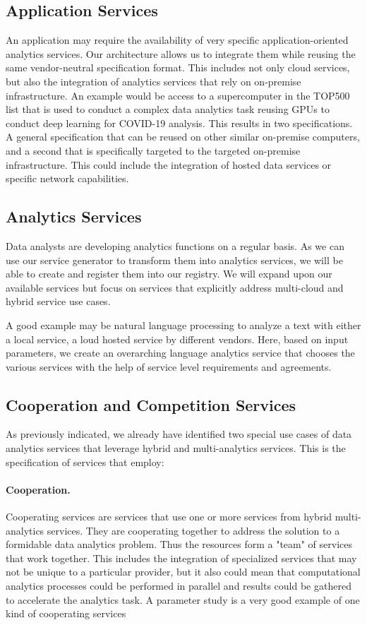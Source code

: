 \subsection{Application Services}

An application may require the availability of very specific
application-oriented analytics services. Our architecture allows us to
integrate them while reusing the same vendor-neutral specification
format. This includes not only cloud services, but also the
integration of analytics services that rely on on-premise
infrastructure. An example would be access to a supercomputer in the
TOP500 list that is used to conduct a complex data analytics task
reusing GPUs to conduct deep learning for COVID-19 analysis.  This
results in two specifications. A general specification that can be
reused on other similar on-premise computers, and a second that is
specifically targeted to the targeted on-premise infrastructure. This
could include the integration of hosted data services or specific
network capabilities.

\subsection{Analytics Services}

Data analysts are developing analytics functions on a regular
basis. As we can use our service generator to transform them into
analytics services, we will be able to create and register them into
our registry. We will expand upon our available services but focus on
services that explicitly address multi-cloud and hybrid service use
cases.

A good example may be natural language processing to analyze a text
with either a local service, a loud hosted service by different
vendors. Here, based on input parameters, we create an overarching
language analytics service that chooses the various services with the
help of service level requirements and agreements.

\subsection{Cooperation and Competition Services}

As previously indicated, we already have identified two special use
cases of data analytics services that leverage hybrid and
multi-analytics 
services. This is the specification of services that
employ:


\paragraph{Cooperation.} Cooperating services are services that use one or
more services from hybrid multi-analytics services. They are
cooperating together to address the solution to a formidable data
analytics problem. Thus the resources form a "team" of services that
work together. This includes the integration of specialized services
that may not be unique to a particular provider, but it also could
mean that computational analytics processes could be performed in
parallel and results could be gathered to accelerate the analytics
task. A parameter study is a very good example of one kind of
cooperating services

